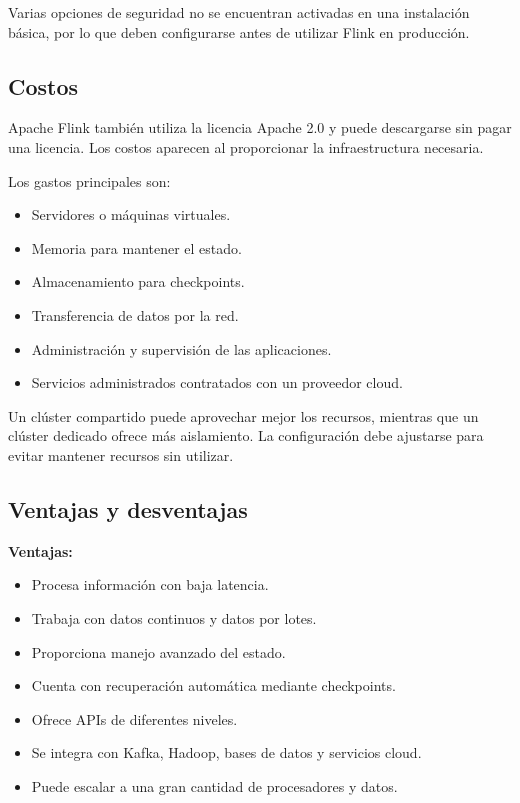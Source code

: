 Varias opciones de seguridad no se encuentran activadas en una instalación
básica, por lo que deben configurarse antes de utilizar Flink en producción.

\subsection{Costos}

Apache Flink también utiliza la licencia Apache 2.0 y puede descargarse sin
pagar una licencia. Los costos aparecen al proporcionar la infraestructura
necesaria.

Los gastos principales son:

\begin{itemize}
    \item Servidores o máquinas virtuales.
    \item Memoria para mantener el estado.
    \item Almacenamiento para checkpoints.
    \item Transferencia de datos por la red.
    \item Administración y supervisión de las aplicaciones.
    \item Servicios administrados contratados con un proveedor cloud.
\end{itemize}

Un clúster compartido puede aprovechar mejor los recursos, mientras que un
clúster dedicado ofrece más aislamiento. La configuración debe ajustarse para
evitar mantener recursos sin utilizar.

\subsection{Ventajas y desventajas}

\textbf{Ventajas:}

\begin{itemize}
    \item Procesa información con baja latencia.
    \item Trabaja con datos continuos y datos por lotes.
    \item Proporciona manejo avanzado del estado.
    \item Cuenta con recuperación automática mediante checkpoints.
    \item Ofrece APIs de diferentes niveles.
    \item Se integra con Kafka, Hadoop, bases de datos y servicios cloud.
    \item Puede escalar a una gran cantidad de procesadores y datos.
\end{itemize}

